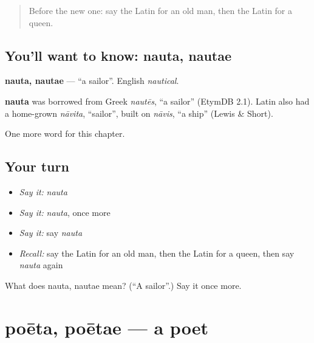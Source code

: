 \label{lesson:LA-C73-nauta}



\begin{quote}
Before the new one: say the Latin for an old man, then the Latin for a queen.
\end{quote}

\subsection*{You'll want to know: nauta, nautae}
\textbf{nauta, nautae} — \textquotedblleft{}a sailor\textquotedblright{}. English \emph{nautical}.

\begin{cousinweb}
\textbf{nauta} was borrowed from Greek \emph{nautēs}, \textquotedblleft{}a sailor\textquotedblright{} (EtymDB 2.1). Latin also had a home-grown \emph{nāvita}, \textquotedblleft{}sailor\textquotedblright{}, built on \emph{nāvis}, \textquotedblleft{}a ship\textquotedblright{} (Lewis \& Short).
\end{cousinweb}

\begin{grammarlens}[title={What you've built}]
One more word for this chapter.
\end{grammarlens}

\subsection*{Your turn}
\begin{itemize}
\raggedright
  \item \emph{Say it:} \emph{nauta}
  \item \emph{Say it:} \emph{nauta}, once more
  \item \emph{Say it:} say \emph{nauta}
  \item \emph{Recall:} say the Latin for an old man, then the Latin for a queen, then say \emph{nauta} again
\end{itemize}

\begin{tcolorbox}[breakable,colback=teal!4,colframe=teal!35!black,title={Before you move on}]
What does nauta, nautae mean? (\textquotedblleft{}A sailor\textquotedblright{}.) Say it once more.
\end{tcolorbox}
\section[poēta, poētae]{poēta, poētae — a poet}

